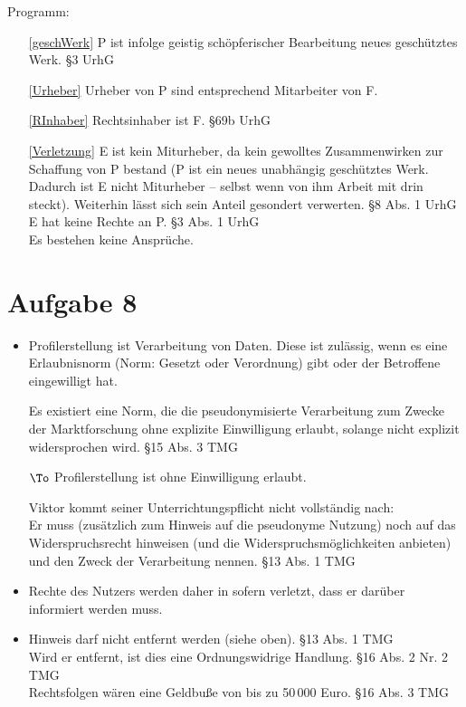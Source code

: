 \documentclass{scrreprt}
\begin{document}
\noindent{}Programm:
\begin{itemize}
\item[\ref{geschWerk}] P ist infolge geistig schöpferischer Bearbeitung neues geschütztes Werk. \hfill §3 UrhG
\item[\ref{Urheber}] Urheber von P sind entsprechend Mitarbeiter von F.
\item[\ref{RInhaber}] Rechtsinhaber ist F. \hfill §69b UrhG
\item[\ref{Verletzung}] E ist kein Miturheber, da kein gewolltes Zusammenwirken zur Schaffung von P bestand (P ist ein neues unabhängig geschütztes Werk. Dadurch ist E nicht Miturheber -- selbst wenn von ihm Arbeit mit drin steckt). Weiterhin lässt sich sein Anteil gesondert verwerten. \hfill §8 Abs. 1 UrhG\\
E hat keine Rechte an P. \hfill §3 Abs. 1 UrhG\\
Es bestehen keine Ansprüche. 
\end{itemize}

\chapter{Aufgabe 8}
\begin{itemize}
\item Profilerstellung ist Verarbeitung von Daten. Diese ist zulässig, wenn es eine Erlaubnisnorm (Norm: Gesetzt oder Verordnung) gibt oder der Betroffene eingewilligt hat.

Es existiert eine Norm, die die pseudonymisierte Verarbeitung zum Zwecke der Marktforschung ohne explizite Einwilligung erlaubt, solange nicht explizit widersprochen wird. \hfill §15 Abs. 3 TMG

$\To$ Profilerstellung ist ohne Einwilligung erlaubt.

Viktor kommt seiner Unterrichtungspflicht nicht vollständig nach:\\
Er muss (zusätzlich zum Hinweis auf die pseudonyme Nutzung) noch auf das Widerspruchsrecht hinweisen (und die Widerspruchsmöglichkeiten anbieten) und den Zweck der Verarbeitung nennen. \hfill §13 Abs. 1 TMG
\item Rechte des Nutzers werden daher in sofern verletzt, dass er darüber informiert werden muss.
\item Hinweis darf nicht entfernt werden (siehe oben). \hfill §13 Abs. 1 TMG\\
Wird er entfernt, ist dies eine Ordnungswidrige Handlung. \hfill §16 Abs. 2 Nr. 2 TMG\\
Rechtsfolgen wären eine Geldbuße von bis zu 50\,000 Euro. \hfill §16 Abs. 3 TMG
\end{itemize}
\end{document}
